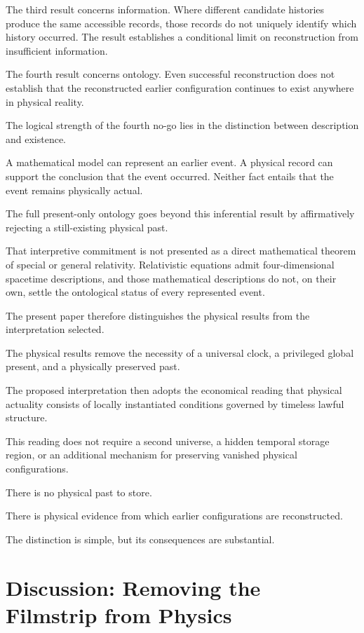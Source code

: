 \documentclass[12pt,onecolumn]{article}
\begin{document}
The third result concerns information. Where different candidate histories produce the same accessible records, those records do not uniquely identify which history occurred. The result establishes a conditional limit on reconstruction from insufficient information.

The fourth result concerns ontology. Even successful reconstruction does not establish that the reconstructed earlier configuration continues to exist anywhere in physical reality.

The logical strength of the fourth no-go lies in the distinction between description and existence.

A mathematical model can represent an earlier event. A physical record can support the conclusion that the event occurred. Neither fact entails that the event remains physically actual.

The full present-only ontology goes beyond this inferential result by affirmatively rejecting a still-existing physical past.

That interpretive commitment is not presented as a direct mathematical theorem of special or general relativity. Relativistic equations admit four-dimensional spacetime descriptions, and those mathematical descriptions do not, on their own, settle the ontological status of every represented event.

The present paper therefore distinguishes the physical results from the interpretation selected.

The physical results remove the necessity of a universal clock, a privileged global present, and a physically preserved past.

The proposed interpretation then adopts the economical reading that physical actuality consists of locally instantiated conditions governed by timeless lawful structure.

This reading does not require a second universe, a hidden temporal storage region, or an additional mechanism for preserving vanished physical configurations.

There is no physical past to store.

There is physical evidence from which earlier configurations are reconstructed.

The distinction is simple, but its consequences are substantial.

\section{Discussion: Removing the Filmstrip from Physics}
\end{document}
